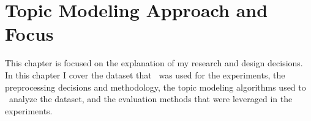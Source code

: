 \documentclass[letterpaper,12pt]{article}
\begin{document}

\chapter{Topic Modeling Approach and Focus}
This chapter is focused on the explanation of my research and design decisions. In this chapter I cover the dataset that \
was used for the experiments, the preprocessing decisions and methodology, the topic modeling algorithms used to \
analyze the dataset, and the evaluation methods that were leveraged in the experiments.

\end{document}
